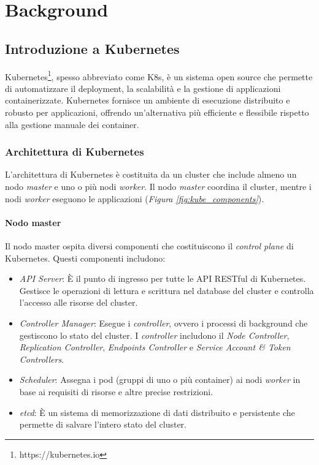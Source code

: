 \chapter{Background}\label{chap:Fondamenti Teorici}

\section{Introduzione a Kubernetes}

Kubernetes\footnote{https://kubernetes.io}, spesso abbreviato come K8s, è un sistema open source che permette di automatizzare il deployment, la scalabilità e la gestione di applicazioni containerizzate. Kubernetes fornisce un ambiente di esecuzione distribuito e robusto per applicazioni, offrendo un'alternativa più efficiente e flessibile rispetto alla gestione manuale dei container.

\subsection{Architettura di Kubernetes}

L'architettura di Kubernetes è costituita da un cluster che include almeno un nodo \textit{master} e uno o più nodi \textit{worker}. Il nodo \textit{master} coordina il cluster, mentre i nodi \textit{worker} eseguono le applicazioni (\textit{Figura \ref{fig:kube_components}}).

\subsubsection{Nodo master}
Il nodo master ospita diversi componenti che costituiscono il \textit{control plane} di Kubernetes. Questi componenti includono:

\begin{itemize}
\item \textit{API Server}: È il punto di ingresso per tutte le API RESTful di Kubernetes. Gestisce le operazioni di lettura e scrittura nel database del cluster e controlla l'accesso alle risorse del cluster.
\item \textit{Controller Manager}: Esegue i \textit{controller}, ovvero i processi di background che gestiscono lo stato del cluster. I \textit{controller} includono il \textit{Node Controller}, \textit{Replication Controller}, \textit{Endpoints Controller} e \textit{Service Account \& Token Controllers}.
\item \textit{Scheduler}: Assegna i pod (gruppi di uno o più container) ai nodi \textit{worker} in base ai requisiti di risorse e altre precise restrizioni.
\item \textit{etcd}: È un sistema di memorizzazione di dati distribuito e persistente che permette di salvare l'intero stato del cluster.
\end{itemize}
